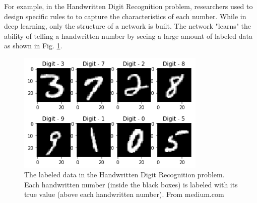 For example, in the Handwritten Digit Recognition problem, researchers used to design specific rules to to capture the characteristics of each number. While in deep learning, only the structure of a network is built. The network "learns" the ability of telling a handwritten number by seeing a large amount of labeled data as shown in Fig. \ref{fig_dig_rec}.
\begin{figure}[!h]
\begin{center}
\includegraphics[width = 9cm]{img/digit_recog.png}
\caption[The labeled data in the Handwritten Digit Recognition problem]{The labeled data in the Handwritten Digit Recognition problem. Each handwritten number (inside the black boxes) is labeled with its true value (above each handwritten number). From medium.com \label{fig_dig_rec}}
\end{center}
\end{figure}

